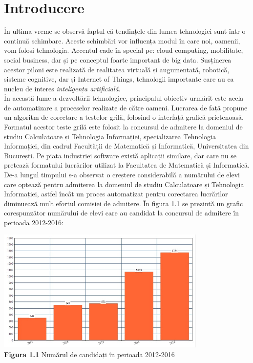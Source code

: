 \documentclass[a4paper,12pt]{report}
\newcommand\tab[1][1cm]{\hspace*{#1}}
\begin{document}
\chapter{Introducere}
\tab În ultima vreme se observă faptul că tendințele din lumea tehnologiei sunt într-o continuă schimbare. Aceste schimbări vor influența modul în care 
noi, oamenii, vom folosi tehnologia. Accentul cade în special pe: cloud computing, mobilitate, social business, dar și pe conceptul foarte
important de big data. Susținerea acestor piloni este realizată de realitatea virtuală și augumentată, robotică, sisteme cognitive, dar și Internet of Things,
tehnologii importante care au ca nucleu de interes \textit{inteligența artificială}.  
\\ \tab În această lume a dezvoltării tehnologice, principalul obiectiv urmărit este acela de automatizare a proceselor realizate de către oameni.
Lucrarea de față propune un algoritm de corectare a testelor grilă, folosind o interfață grafică prietenoasă. Formatul acestor teste grilă este folosit
 la concursul de admitere la domeniul de studiu Calculatoare și Tehnologia Informației, specializarea Tehnologia Informației, din cadrul Facultății de Matematică și
Informatică, Universitatea din București. Pe piața industriei software există aplicații similare\cite{articol1, articol2}, dar care nu se pretează formatului lucrărilor utilizat la Facultatea de Matematică și Informatică.
\\ \tab De-a lungul timpului s-a observat o creștere considerabilă a numărului de elevi care optează pentru admiterea la domeniul de studiu Calculatoare și Tehnologia Informației, astfel
încât un proces automatizat pentru corectarea lucrărilor diminuează mult efortul comisiei de admitere. În figura 1.1 se prezintă un grafic corespunzător numărului de elevi care au candidat la concursul
de admitere în perioada 2012-2016:
\begin {center} 
	\begin {footnotesize} 
		\includegraphics[width =104mm]{fig1_1}  \\
		\textbf  {Figura 1.1} Numărul de candidați în perioada 2012-2016
	\end {footnotesize} 
\end {center}
\end{document}

